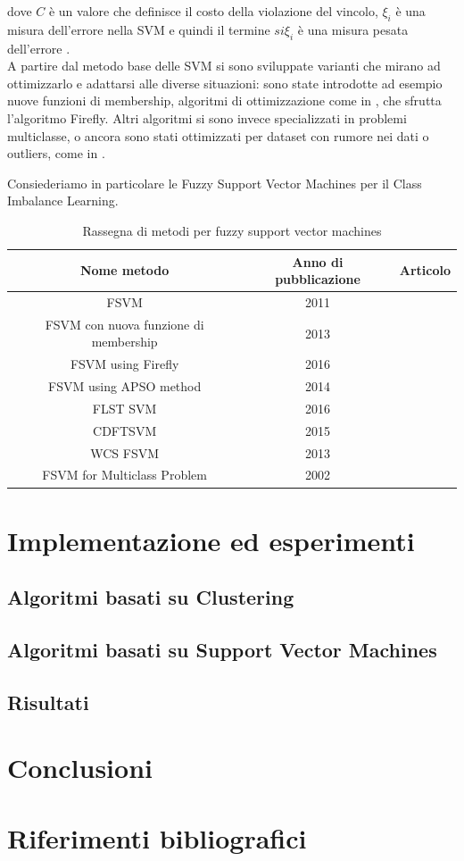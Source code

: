 \documentclass[oneside, openany]{book}
\begin{document}
	dove $C$ è un valore che definisce il costo della violazione del vincolo, $\xi_i$ è una misura dell'errore nella SVM e quindi il termine $si\xi_i$ è una misura pesata dell'errore\cite{bib:fsvm} \cite{bib:fsvm2}.\\
	
	A partire dal metodo base delle SVM si sono sviluppate varianti che mirano ad ottimizzarlo e adattarsi alle diverse situazioni: sono state introdotte ad esempio nuove funzioni di membership, algoritmi di ottimizzazione come in \cite{bib:firefly}, che sfrutta l'algoritmo Firefly. Altri algoritmi si sono invece specializzati in problemi multiclasse\cite{bib:multi}, o ancora sono stati ottimizzati per dataset con rumore nei dati o outliers, come in \cite{bib:apso}\cite{bib:wcs}.
	
	Consiederiamo in particolare le Fuzzy Support Vector Machines per il Class Imbalance Learning\cite{bib:cil}. 
		\begin{table}[h!]
		\caption{Rassegna di metodi per fuzzy support vector machines}
		\begin{center}\begin{tabular}{ |c|c|c| } 
				\hline
				Nome metodo & Anno di pubblicazione & Articolo\\
				\hline
				FSVM & 2011 & \cite{bib:fsvm}\\
				\hline
				FSVM con nuova funzione di membership & 2013 & \cite{bib:fsvm2}\\ 
				\hline
				FSVM using Firefly & 2016 & \cite{bib:firefly}\\
				\hline
				FSVM using APSO method & 2014 & \cite{bib:apso} \\
				\hline
				FLST SVM & 2016 & \cite{bib:flst} \\
				\hline
				CDFTSVM & 2015 & \cite{bib:cdt}\\
				\hline	
				WCS FSVM & 2013 & \cite{bib:wcs}\\
				\hline	
				FSVM for Multiclass Problem & 2002 & \cite{bib:multi} \\
				\hline										
			\end{tabular}
		\end{center}
		\label{tab:svm}	
	\end{table}
	\chapter{Implementazione ed esperimenti}
	\section{Algoritmi basati su Clustering}
	\section{Algoritmi basati su Support Vector Machines}
	\section{Risultati}
	\chapter{Conclusioni}
	\chapter{Riferimenti bibliografici}

{}
\end{document}
